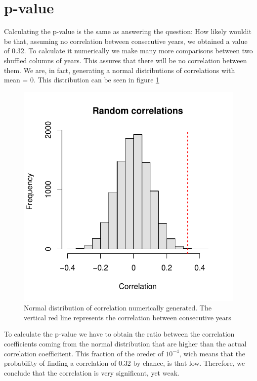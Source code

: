 \documentclass[12pt]{article}
\begin{document}
	\section{p-value}
		Calculating the p-value is the same as answering the question: How likely wouldit be that, assuming no correlation between consecutive years, we obtained a value of 0.32. To calculate it numerically we make many more comparisons between two shuffled columns of years. This assures that there will be no correlation between them. We are, in fact, generating a normal distributions of correlations with mean = 0. This distribution can be seen in figure \ref{normal}\\
		\begin{figure}
			\includegraphics[scale = 0.9]{hist_p_value.pdf}
			\centering
			\caption{Normal distribution of correlation numerically generated. The vertical red line represents the correlation between consecutive years}
			\label{normal}
		\end{figure}
		To calculate the p-value we have to obtain the ratio between the correlation coefficients coming from the normal distribution that are higher than the actual correlation coefficitent. This fraction of the oreder of $10^{-4}$, wich means that the probability of finding a correlation of 0.32 by chance, is that low. Therefore, we conclude that the correlation is very significant, yet weak.
		
\end{document}
